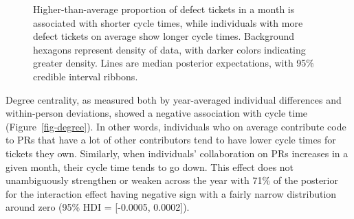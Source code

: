 \documentclass[
]{article}
\begin{document}
\begin{figure}[htbp]


\caption[Higher-than-average proportion of defect tickets in a month is
associated with shorter cycle times, while individuals with more defect
tickets on average show longer cycle
times]{\label{fig-defecttickets}Higher-than-average proportion of defect
tickets in a month is associated with shorter cycle times, while
individuals with more defect tickets on average show longer cycle times.
Background hexagons represent density of data, with darker colors
indicating greater density. Lines are median posterior expectations,
with 95\% credible interval ribbons.}

\end{figure}%

Degree centrality, as measured both by year-averaged individual
differences and within-person deviations, showed a negative association
with cycle time (Figure~\ref{fig-degree}). In other words, individuals
who on average contribute code to PRs that have a lot of other
contributors tend to have lower cycle times for tickets they own.
Similarly, when individuals' collaboration on PRs increases in a given
month, their cycle time tends to go down. This effect does not
unambiguously strengthen or weaken across the year with 71\% of the
posterior for the interaction effect having negative sign with a fairly
narrow distribution around zero (95\% HDI = {[}-0.0005, 0.0002{]}).
\end{document}
